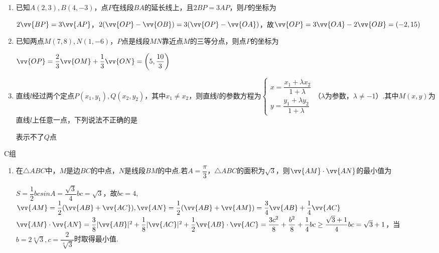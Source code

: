 \begin{enumerate}
    \item 已知$A(2, 3), B(4, -3)$，点$P$在线段$BA$的延长线上，且$2BP = 3AP$，则$P$的坐标为
    \begin{jieda}
        $2\vv{BP} = 3\vv{AP}$，$2(\vv{OP} - \vv{OB}) = 3(\vv{OP} - \vv{OA})$，故$\vv{OP} = 3\vv{OA} - 2\vv{OB} = (-2, 15)$
    \end{jieda}
    \item 已知两点$M(7,8), N(1, -6)$，$P$点是线段$MN$靠近点$M$的三等分点，则点$P$的坐标为
    \begin{jieda}
        $\vv{OP} = \dfrac{2}{3}\vv{OM} + \dfrac{1}{3} \vv{ON} = \left(5, \dfrac{10}{3}\right)$
    \end{jieda}
    \item 直线$l$经过两个定点$P(x_1, y_1), Q(x_2, y_2)$，其中$x_1 \neq x_2$，则直线$l$的参数方程为$\left \{ \begin{array}{l}
         x = \dfrac{x_1 + \lambda x_2}{1+\lambda} \\
         y = \dfrac{y_1 + \lambda y_2}{1+\lambda}
    \end{array} \right.$（$\lambda$为参数，$\lambda \neq -1$）.其中$M(x, y)$为直线$l$上任意一点，下列说法不正确的是
    \begin{jieda}
        表示不了$Q$点
    \end{jieda}
\end{enumerate}
C组
\begin{enumerate}
    \item 在$\triangle{ABC}$中，$M$是边$BC$的中点，$N$是线段$BM$的中点.若$A = \dfrac{\pi}{3}$，$\triangle{ABC}$的面积为$\sqrt{3}$，则$\vv{AM}\cdot\vv{AN}$的最小值为
    \begin{jieda}
        $S = \dfrac{1}{2}bcsinA = \dfrac{\sqrt{3}}{4}bc = \sqrt{3}$，故$bc = 4$, $\vv{AM} = \dfrac{1}{2}(\vv{AB} + \vv{AC}), \vv{AN} = \dfrac{1}{2}(\vv{AB} + \vv{AM}) = \dfrac{3}{4}\vv{AB} + \dfrac{1}{4}\vv{AC}$ \\
        $\vv{AM}\cdot\vv{AN} = \dfrac{3}{8}|\vv{AB}|^2 + \dfrac{1}{8}|\vv{AC}|^2 + \dfrac{1}{2}\vv{AB}\cdot\vv{AC} = \dfrac{3c^2}{8} + \dfrac{b^2}{8} + \dfrac{1}{4}bc \geq \dfrac{\sqrt{3}+1}{4}bc = \sqrt{3}+1$，当$b = 2\sqrt[4]{3}, c = \dfrac{2}{\sqrt[4]{3}}$时取得最小值.
    \end{jieda}
\end{enumerate}